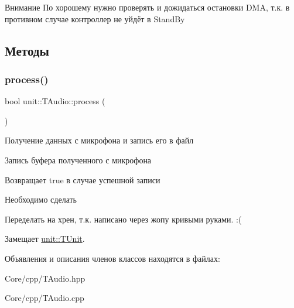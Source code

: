\begin{DoxyAttention}{Внимание}
По хорошему нужно проверять и дожидаться остановки D\+MA, т.\+к. в противном случае контроллер не уйдёт в Stand\+By 
\end{DoxyAttention}


\subsection{Методы}
\mbox{\label{classunit_1_1_t_audio_ad547ef4d28534b9cd76d2e7eb539d1e0}} 
\subsubsection{\texorpdfstring{process()}{process()}}
{\footnotesize\ttfamily bool unit\+::\+T\+Audio\+::process (\begin{DoxyParamCaption}{ }\end{DoxyParamCaption})\hspace{0.3cm}{\ttfamily [virtual]}}



Получение данных с микрофона и запись его в файл 



 Запись буфера полученного с микрофона \begin{DoxyReturn}{Возвращает}
true в случае успешной записи 
\end{DoxyReturn}
\begin{DoxyRefDesc}{Необходимо сделать}
\item[\hyperlink{todo__todo000006}{Необходимо сделать}]Переделать на хрен, т.\+к. написано через жопу кривыми руками. \+:( \end{DoxyRefDesc}


Замещает \hyperlink{classunit_1_1_t_unit_a108691c8b988d97c65237c83a31db706}{unit\+::\+T\+Unit}.



Объявления и описания членов классов находятся в файлах\+:\begin{DoxyCompactItemize}
\item 
Core/cpp/T\+Audio.\+hpp\item 
Core/cpp/T\+Audio.\+cpp\end{DoxyCompactItemize}
